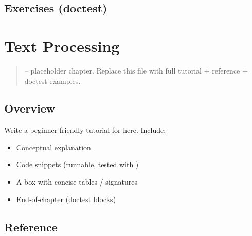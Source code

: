 \documentclass[a4paper,11pt,english]{sphinxmanual}
\begin{document}
\subsection{Exercises (doctest)}
\label{\detokenize{stdlib/testing_debugging:exercises-doctest}}
\begin{sphinxVerbatim}[commandchars=\\\{\}]
\end{sphinxVerbatim}

\sphinxstepscope


\section{Text Processing}
\label{\detokenize{stdlib/text_processing:text-processing}}\label{\detokenize{stdlib/text_processing::doc}}\begin{quote}

\sphinxAtStartPar
{} – placeholder chapter. Replace this file with full tutorial + reference + doctest examples.
\end{quote}


\subsection{Overview}
\label{\detokenize{stdlib/text_processing:overview}}
\sphinxAtStartPar
Write a beginner‑friendly tutorial for  here. Include:
\begin{itemize}
\item {} 
\sphinxAtStartPar
Conceptual explanation

\item {} 
\sphinxAtStartPar
Code snippets (runnable, tested with )

\item {} 
\sphinxAtStartPar
A  box with concise tables / signatures

\item {} 
\sphinxAtStartPar
End‑of‑chapter  (doctest blocks)

\end{itemize}


\subsection{Reference}
\label{\detokenize{stdlib/text_processing:reference}}
\end{document}
